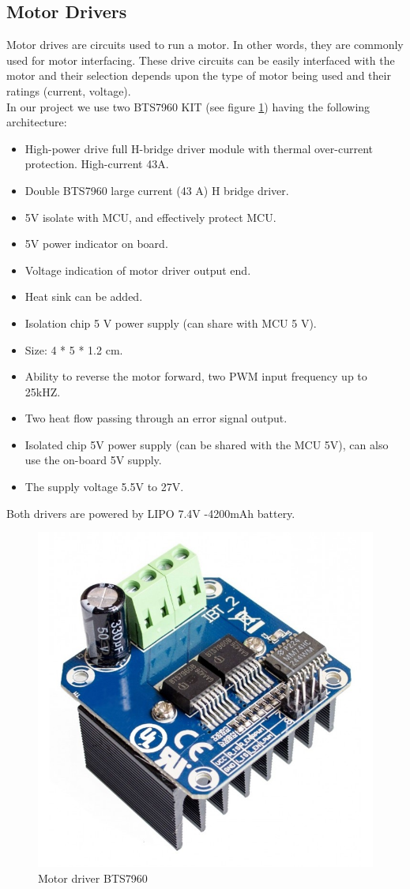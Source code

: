 \subsection{Motor Drivers}
\hspace{2cm}Motor drives are circuits used to run a motor. In other words, they are commonly used for motor interfacing. These drive circuits can be easily interfaced with the motor and their selection depends upon the type of motor being used and their ratings (current, voltage).\cite{web013}\\
In our project we use two BTS7960 KIT (see figure \ref{fig:motor drivers}) having the following architecture:
\begin{itemize}
    \item High-power drive full H-bridge driver module with thermal over-current protection.  High-current 43A.
    \item Double BTS7960 large current (43 A) H bridge driver.
    \item 5V isolate with MCU, and effectively protect MCU.
    \item 5V power indicator on board.
    \item Voltage indication of motor driver output end.
    \item Heat sink can be added. 
    \item Isolation chip 5 V power supply (can share with MCU 5 V).
    \item Size: 4 * 5 * 1.2 cm.
    \item Ability to reverse the motor forward, two PWM input frequency up to 25kHZ.
    \item Two heat flow passing through an error signal output.
    \item Isolated chip 5V power supply (can be shared with the MCU 5V), can also use the on-board 5V supply.
    \item The supply voltage 5.5V to 27V. 
\end{itemize}
Both drivers are powered by LIPO 7.4V -4200mAh battery.

\begin{figure}[H]%
    \center%
    \includegraphics[width=.5\textwidth]
    {images/Alzahraa/motor_drivers.jpg}%
    \caption[Motor Driver]{Motor driver BTS7960}\label{fig:motor drivers}%
  \end{figure} 

